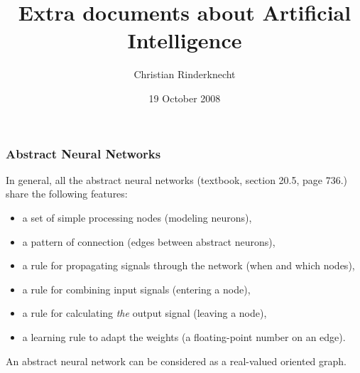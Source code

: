 \documentclass[compress,dvipdfmx]{beamer}
\title{Extra documents about Artificial Intelligence}
\author{Christian Rinderknecht}
\date{19 October 2008}
\begin{document}
\frame{\maketitle}

%
\begin{frame}
\frametitle{Abstract Neural Networks}

In general, all the abstract neural networks (textbook, section 20.5,
page 736.) share the following features:
\begin{itemize}

  \item a set of simple processing nodes (modeling neurons),

  \item a pattern of connection (edges between abstract neurons),

  \item a rule for propagating signals through the network (when and
  which nodes),

  \item a rule for combining input signals (entering a node),

  \item a rule for calculating \emph{the} output signal (leaving a
  node),

  \item a learning rule to adapt the weights (a floating-point number
  on an edge).

\end{itemize}
An abstract neural network can be considered as a real-valued
oriented graph.

\end{frame}
\end{document}
